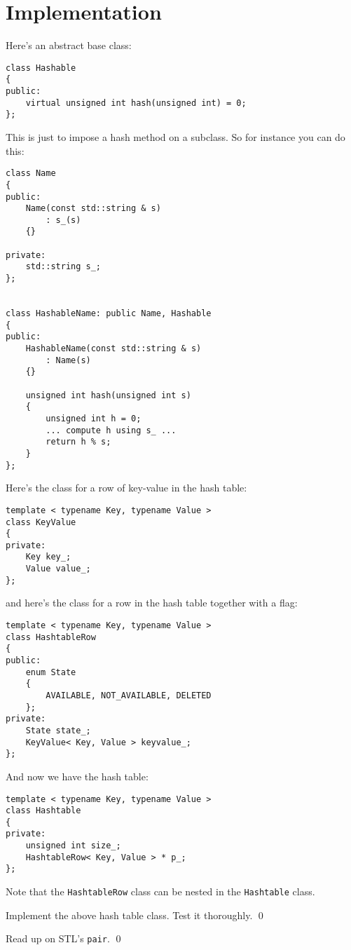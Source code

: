 \newpage
\section{Implementation}

Here's an abstract base class:
{\small
\begin{Verbatim}[frame=single]
class Hashable
{
public:
    virtual unsigned int hash(unsigned int) = 0;
};
\end{Verbatim}
}
This is just to impose a hash method on a subclass.
So for instance you can do this:
{\small
\begin{Verbatim}[frame=single]
class Name
{
public:
    Name(const std::string & s)
        : s_(s)
    {}

private:
    std::string s_;
};


class HashableName: public Name, Hashable
{
public:
    HashableName(const std::string & s)
        : Name(s) 
    {}
    
    unsigned int hash(unsigned int s)
    {
        unsigned int h = 0;
        ... compute h using s_ ...
        return h % s;
    }
};
\end{Verbatim}
}
Here's the class for a row of key-value in the hash table:
{\small
\begin{Verbatim}[frame=single]
template < typename Key, typename Value >
class KeyValue
{
private:
    Key key_;
    Value value_;
};
\end{Verbatim}
}
and here's the class for a row in the hash table together with a 
flag:
{\small
\begin{Verbatim}[frame=single]
template < typename Key, typename Value >
class HashtableRow
{
public:
    enum State
    { 
        AVAILABLE, NOT_AVAILABLE, DELETED 
    };
private:
    State state_;
    KeyValue< Key, Value > keyvalue_;
};
\end{Verbatim}
}
And now we have the hash table:
{\small
\begin{Verbatim}[frame=single]
template < typename Key, typename Value >
class Hashtable
{
private:
    unsigned int size_;
    HashtableRow< Key, Value > * p_;
};
\end{Verbatim}
}

Note that the \verb!HashtableRow! class can be nested in the \verb!Hashtable!
class.

\begin{ex}
Implement the above hash table class.
Test it thoroughly.
\qed
\end{ex}


\begin{ex}
Read up on STL's \verb!pair!.
\qed
\end{ex}

